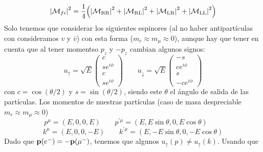 \begin{equation}
	\vqty{\Mcal_{fi}}^2 = \frac{1}{4} \pqty{\vqty{\Mcal_{\text{RR}}}^2+\vqty{\Mcal_{\text{RL}}}^2
		+\vqty{\Mcal_{\text{LR}}}^2+\vqty{\Mcal_{\text{LL}}}^2}
\end{equation}
Solo tenemos que considerar los siguientes espinores (al no haber antipartículas con consideramos $v$ y $\bar{v}$) con esta forma ($m_e\approx m_\mu\approx 0$), aunque hay que tener en cuenta que al tener momentso $p_z$ y $-p_z$ cambian algunos signos:
\begin{equation}
	u_\uparrow = \sqrt{E} \begin{pmatrix}
		c \\ se^{i\phi} \\ c \\ se^{i\phi}
	\end{pmatrix} \qquad
	u_\downarrow= \sqrt{E} \begin{pmatrix}
		-s \\ ce^{i\phi} \\ s \\ -ce^{i\phi}
	\end{pmatrix}
\end{equation}
con $c=\cos (\theta/2)$ y $s=\sin(\theta/2)$, siendo este $\theta$ el ángulo de salida de las partículas. Los momentos de nuestras partículas (caso de masa despreciable $m_e\approx m_\mu\approx 0$)
\begin{equation}
    p^\mu= (E,0,0,E) \qquad 
    p^{\prime\mu}= (E,E\sin \theta,0,E \cos \theta) \qquad 
\end{equation}
\begin{equation}
    k^\mu= (E,0,0,-E) \qquad 
    k^{\prime\mu}= (E,-E\sin \theta,0,-E \cos \theta)
\end{equation}
Dado que $\mathbf{p}(e^-)=-\mathbf{p}(\mu^-)$, tenemos que algunos $u_\uparrow (p) \neq u_\uparrow (k)$. Usando que 

